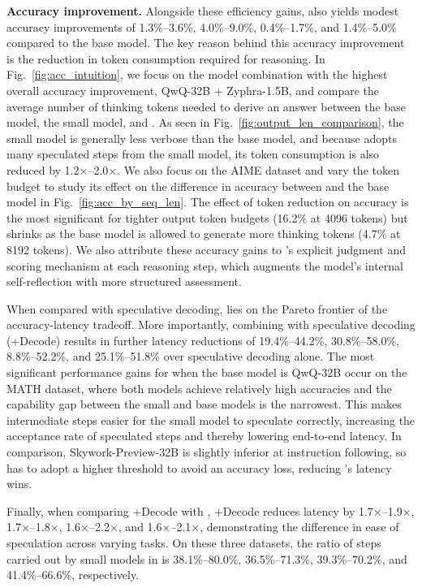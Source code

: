 \textbf{Accuracy improvement.} Alongside these efficiency gains, \name{} also yields modest accuracy improvements of 1.3\%--3.6\%, 4.0\%--9.0\%, 0.4\%--1.7\%, and 1.4\%--5.0\% compared to the base model. The key reason behind this accuracy improvement is the reduction in token consumption required for reasoning. In Fig.~\ref{fig:acc_intuition}, we focus on the model combination with the highest overall accuracy improvement, QwQ-32B + Zyphra-1.5B, and compare the average number of thinking tokens needed to derive an answer between the base model, the small model, and \name{}. As seen in Fig.~\ref{fig:output_len_comparison}, the small model is generally less verbose than the base model, and because \name{} adopts many speculated steps from the small model, its token consumption is also reduced by 1.2$\times$--2.0$\times$. We also focus on the AIME dataset and vary the token budget to study its effect on the difference in accuracy between \name{} and the base model in Fig.~\ref{fig:acc_by_seq_len}. The effect of token reduction on accuracy is the most significant for tighter output token budgets (16.2\% at 4096 tokens) but shrinks as the base model is allowed to generate more thinking tokens (4.7\% at 8192 tokens). We also attribute these accuracy gains to \name{}’s explicit judgment and scoring mechanism at each reasoning step, which augments the model’s internal self-reflection with more structured assessment. 





When compared with speculative decoding, \name{} lies on the Pareto frontier of the accuracy-latency tradeoff. More importantly, combining \name{} with speculative decoding (\name{}+Decode) results in further latency reductions of 19.4\%--44.2\%, 30.8\%--58.0\%, 8.8\%--52.2\%, and 25.1\%--51.8\% over speculative decoding alone.
The most significant performance gains for \name{} when the base model is QwQ-32B occur on the MATH dataset, where both models achieve relatively high accuracies and the capability gap between the small and base models is the narrowest. This makes intermediate steps easier for the small model to speculate correctly, increasing the acceptance rate of speculated steps and thereby lowering end-to-end latency. In comparison, Skywork-Preview-32B is slightly inferior at instruction following, so \name{} has to adopt a higher threshold to avoid an accuracy loss, reducing \name{}'s latency wins.

Finally, when comparing \name{}+Decode with \name{}, \name{}+Decode reduces latency by 1.7$\times$--1.9$\times$, 1.7$\times$--1.8$\times$, 1.6$\times$--2.2$\times$, and 1.6$\times$--2.1$\times$, demonstrating the difference in ease of speculation across varying tasks. On these three datasets, the ratio of steps carried out by small models in \name{} is 38.1\%--80.0\%, 36.5\%--71.3\%, 39.3\%--70.2\%, and 41.4\%--66.6\%, respectively.
















